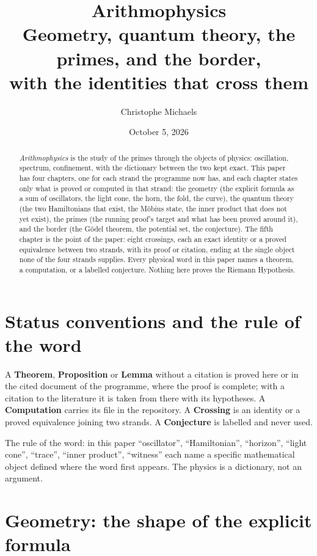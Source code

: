 \documentclass[11pt]{article}
\title{Arithmophysics\\ \large Geometry, quantum theory, the primes, and the border,\\ with the identities that cross them}
\author{Christophe Michaels}
\date{October 5, 2026}
\theoremstyle{definition}
\theoremstyle{remark}
\begin{document}
\maketitle

\begin{abstract}
\noindent \emph{Arithmophysics} is the study of the primes through the objects of physics: oscillation, spectrum, confinement, with the dictionary between the two kept exact. This paper has four chapters, one for each strand the programme now has, and each chapter states only what is proved or computed in that strand: the geometry (the explicit formula as a sum of oscillators, the light cone, the horn, the fold, the curve), the quantum theory (the two Hamiltonians that exist, the Möbius state, the inner product that does not yet exist), the primes (the running proof's target and what has been proved around it), and the border (the Gödel theorem, the potential set, the conjecture). The fifth chapter is the point of the paper: eight crossings, each an exact identity or a proved equivalence between two strands, with its proof or citation, ending at the single object none of the four strands supplies. Every physical word in this paper names a theorem, a computation, or a labelled conjecture. Nothing here proves the Riemann Hypothesis.
\end{abstract}

\tableofcontents

\section*{Status conventions and the rule of the word}
A \textbf{Theorem}, \textbf{Proposition} or \textbf{Lemma} without a citation is proved here or in the cited document of the programme, where the proof is complete; with a citation to the literature it is taken from there with its hypotheses. A \textbf{Computation} carries its file in the repository. A \textbf{Crossing} is an identity or a proved equivalence joining two strands. A \textbf{Conjecture} is labelled and never used.

The rule of the word: in this paper ``oscillator'', ``Hamiltonian'', ``horizon'', ``light cone'', ``trace'', ``inner product'', ``witness'' each name a specific mathematical object defined where the word first appears. The physics is a dictionary, not an argument.

\section{Geometry: the shape of the explicit formula}\label{sec:geo}
\end{document}

